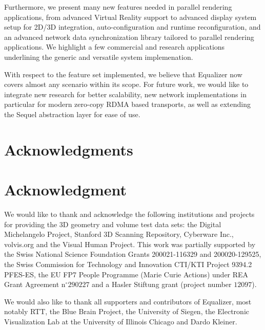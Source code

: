 \documentclass[10pt,journal,compsoc]{IEEEtran}
\begin{document}
Furthermore, we present many new features needed in parallel rendering
applications, from advanced Virtual Reality support to advanced display system
setup for 2D/3D integration, auto-configuration and runtime reconfiguration, and
an advanced network data synchronization library tailored to parallel rendering
applications. We highlight a few commercial and research applications
underlining the generic and versatile system implemenation.

With respect to the feature set implemented, we believe that Equalizer now
covers almost any scenario within its scope. For future work, we would like to
integrate new research for better scalability, new network implementations in
particular for modern zero-copy RDMA based transports, as well as extending the
Sequel abstraction layer for ease of use.

\appendices
\ifCLASSOPTIONcompsoc
  \section*{Acknowledgments}
\else
  \section*{Acknowledgment}
\fi
We would like to thank and acknowledge the following institutions and projects
for providing the 3D geometry and volume test data sets: the Digital
Michelangelo Project, Stanford 3D Scanning Repository, Cyberware Inc.,
volvis.org and the Visual Human Project. 
%
This work was partially supported by
the Swiss National Science Foundation Grants 200021-116329 and 200020-129525,
the Swiss Commission for Technology and Innovation CTI/KTI Project 9394.2 PFES-ES,
the EU FP7 People Programme (Marie Curie Actions) under REA Grant Agreement n$^{\circ}290227$ and
a Hasler Stiftung grant (project number $12097$).

We would also like to thank all supporters and contributors of
\textsf{Equalizer}, most notably RTT, the Blue Brain Project, the University of
Siegen, the Electronic Visualization Lab at the University of Illinois Chicago
and Dardo Kleiner.

\end{document}
